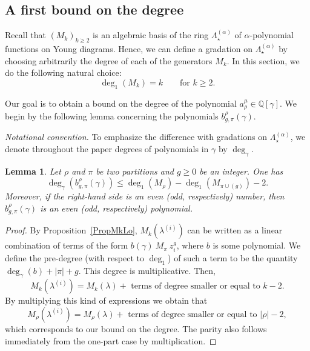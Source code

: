 \documentclass[11pt]{amsart}
\theoremstyle{plain}
\newtheorem{lemma}{Lemma}[section]
\theoremstyle{remark}
\newcommand{\QQ}{\mathbb{Q}}
\newcommand{\Pola}{\Lambda_\star^{(\alpha)}}
\newcommand{\lo}{\lambda^{(i)}}
\begin{document}
\subsection{A first bound on the degree}\label{SubsectBound1}
Recall that $(M_k)_{k \geq 2}$ is an algebraic basis of the ring
$\Pola$ of
$\alpha$-polynomial functions on Young diagrams.
Hence, we can define a gradation on $\Pola$ by choosing
arbitrarily the degree of each of the generators $M_k$.
In this section, we do the following natural choice: 
\[ \deg_1(M_k)=k \qquad \text{for } k\geq 2. \]

Our goal is to obtain a bound on the degree of the polynomial $a^\mu_\rho\in\QQ[\gamma]$.
We begin by the following lemma concerning the polynomials
$b_{g,\pi}^\rho(\gamma)$.

{\em Notational convention.}
To emphasize the difference with gradations on $\Pola$, we denote throughout the paper
degrees of polynomials in $\gamma$ by $\deg_\gamma$.

\begin{lemma}
\label{lem:firstbound}
    Let $\rho$ and $\pi$ be two partitions and $g\geq 0$ be an integer. One has
    \[\deg_\gamma(b_{g,\pi}^\rho(\gamma)) \leq \deg_1(M_\rho) - \deg_1(M_{\pi \cup (g)}) - 2. \]
    Moreover, if the right-hand side is an even (odd, respectively) number,
    then $b_{g,\pi}^\rho(\gamma)$ is an even (odd, respectively) polynomial.
    \label{LemDeg1B}
\end{lemma}
\begin{proof}
    By Proposition~\ref{PropMkLo}, $M_k(\lambda^{(i)})$ can be written as a linear combination of terms of the form
    $b(\gamma)\ M_\pi\ z_i^g$, where $b$ is some polynomial.
    We define the pre-degree (with respect to $\deg_1$)
    of such a term to be the quantity $\deg_\gamma(b) + |\pi| + g$.
    This degree is multiplicative.
    Then, 
    \[M_k(\lo) = M_k(\lambda) + \text{ terms of degree smaller or equal to }k-2.\]
    By multiplying this kind of expressions we obtain that
    \[M_\rho(\lo) = M_\rho(\lambda) + \text{ terms of degree smaller or equal to }|\rho|-2,\]
    which corresponds to our bound on the degree.
    The parity also follows immediately from the one-part case by multiplication.
\end{proof}
\end{document}
